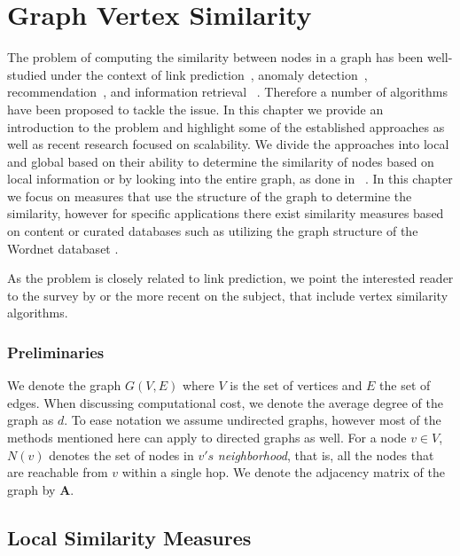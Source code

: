 \chapter{Graph Vertex Similarity}
\label{ch:bg-graph-similarity}

The problem of computing the similarity between nodes in a graph has been
well-studied under the context of link prediction~\cite{link-prediction-survey},
anomaly detection~\cite{graphsim-anomaly},
recommendation~\cite{graphsim-recommendation}, and information retrieval
~\cite{graphsim-retrieval}. Therefore a
number of algorithms have been proposed to tackle the issue.
In this chapter we provide an introduction to the problem and
highlight some of the established approaches as well as recent
research focused on scalability. We divide the approaches into local
and global based on their ability to determine the similarity of nodes
based on local information or by looking into the entire graph, as done in
~\cite{link-prediction-survey}.
In this chapter we focus on
measures that use the structure of the graph to determine the similarity,
however for specific applications there exist similarity measures
based on content or curated databases such as utilizing the graph
structure of the Wordnet databaset \cite{wordnet-similarity, wordnet-relatedness, wordsim}.

As the problem is closely related to link prediction, we point the interested reader to
the survey by \citet{link-prediction-survey} or the more
recent \cite{link-prediction-survey-2017} on the subject,
that include vertex similarity algorithms.

\subsection*{Preliminaries}


We denote the graph $G(V, E)$ where $V$ is the set of vertices and $E$ the set
of edges. When discussing computational cost, we denote the average degree of the graph as $d$.
To ease notation we assume undirected graphs, however most of the methods
mentioned here can apply to directed graphs as well.
For a node $v \in V$, $N(v)$ denotes the set of nodes in $v's$ \emph{neighborhood},
that is, all the nodes that are reachable from $v$ within a single hop.
We denote the adjacency matrix of the graph by $\mathbf{A}$.


\section{Local Similarity Measures}

